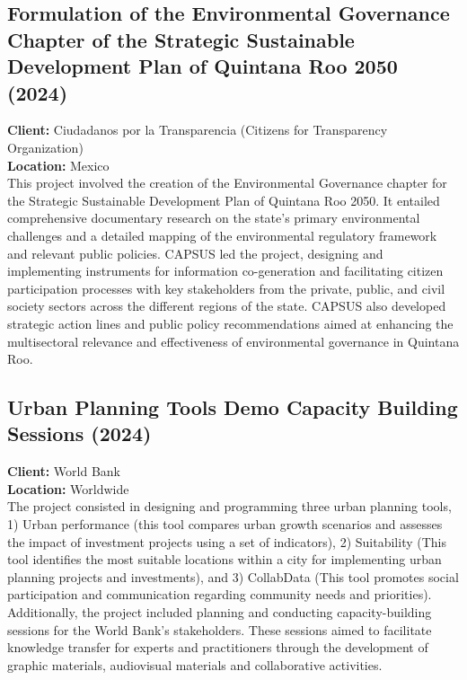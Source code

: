 \documentclass[
	a4paper,
	12pt,
	unnumberedsections,
]{CSSullivanBusinessReport}
\begin{document}
\subsection{Formulation of the Environmental Governance Chapter of the Strategic Sustainable Development Plan of Quintana Roo 2050 (2024)}
\textbf{Client:}   Ciudadanos por la Transparencia (Citizens for Transparency Organization) \\
\textbf{Location:}  Mexico \\[0.5em]
 This project involved the creation of the Environmental Governance chapter for the Strategic Sustainable Development Plan of Quintana Roo 2050. It entailed comprehensive documentary research on the state's primary environmental challenges and a detailed mapping of the environmental regulatory framework and relevant public policies. CAPSUS led the project, designing and implementing instruments for information co-generation and facilitating citizen participation processes with key stakeholders from the private, public, and civil society sectors across the different regions of the state. CAPSUS also developed strategic action lines and public policy recommendations aimed at enhancing the multisectoral relevance and effectiveness of environmental governance in Quintana Roo.

\subsection{Urban Planning Tools Demo Capacity Building Sessions (2024)}
\textbf{Client:}   World Bank \\
\textbf{Location:}  Worldwide \\[0.5em]
 The project consisted in designing and programming three urban planning tools, 1) Urban performance (this tool compares urban growth scenarios and assesses the impact of investment projects using a set of indicators), 2) Suitability (This tool identifies the most suitable locations within a city for implementing urban planning projects and investments), and 3) CollabData (This tool promotes social participation and communication regarding community needs and priorities). Additionally, the project included planning and conducting capacity-building sessions for the World Bank’s stakeholders. These sessions aimed to facilitate knowledge transfer for experts and practitioners through the development of graphic materials, audiovisual materials and collaborative activities.
\end{document}
